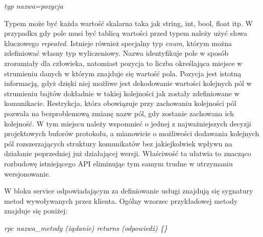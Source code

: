 \centerline{\textit{typ nazwa=pozycja}}
\noindent
Typem może być każda wartość skalarna taka jak string, int, bool, float itp. W przypadku gdy pole musi być tablicą wartości przed typem należy użyć słowa kluczowego \textit{repeated}. Istnieje również specjalny typ \textit{enum}, którym można zdefiniować własny typ wyliczeniowy. Nazwa identyfikuje pole w sposób zrozumiały dla człowieka, natomiast pozycja to liczba określająca miejsce w strumieniu danych w którym znajduje się wartość pola. Pozycja jest istotną informacją, gdyż dzięki niej możliwe jest dekodowanie wartości kolejnych pól w strumieniu bajtów dokładnie w takiej kolejności jak zostały zdefiniowane w komunikacie. Restrykcja, która obowiązuje przy zachowaniu kolejności pól pozwala na bezproblemową zmianę nazw pól, gdy zostanie zachowana ich kolejność. W tym miejscu należy wspomnieć o jednej z najważniejszych decyzji projektowych buforów protokołu, a mianowicie o możliwości dodawania kolejnych pól rozszerzających struktury komunikatów bez jakiejkolwiek wpływu na działanie poprzedniej już działającej wersji. Właściwość ta ułatwia to znacząco rozbudowę istniejącego API eliminując tym samym trudne w utrzymaniu wersjonowanie. 
\par W bloku service odpowiadającym za definiowanie usługi znajdują się sygnatury metod wywoływanych przez klienta. Ogólny wzorzec przykładowej metody znajduje się poniżej:

\centerline{\textit{rpc nazwa\_metody (żądanie) returns (odpowiedź) \{\}}}

